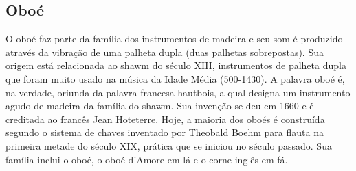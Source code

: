 \subsection*{Oboé}

O oboé faz parte da família dos instrumentos de madeira e seu som
é produzido através da vibração de uma palheta dupla (duas palhetas
sobrepostas). Sua origem está relacionada ao shawm do século XIII,
instrumentos de palheta dupla que foram muito usado na música da Idade
Média (500-1430). A palavra oboé é, na verdade, oriunda da palavra
francesa hautbois, a qual designa um instrumento agudo de madeira da
família do shawm. Sua invenção se deu em 1660 e é creditada ao francês
Jean Hoteterre. Hoje, a maioria dos oboés é construída segundo o
sistema de chaves inventado por Theobald Boehm para flauta na primeira
metade do século XIX, prática que se iniciou no século passado. Sua
família inclui o oboé, o oboé d’Amore em lá e o corne inglês em fá.